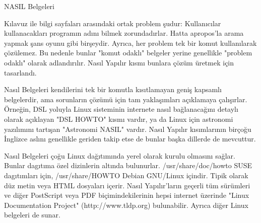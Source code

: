 \begin{section}{NASIL Belgeleri}

Kılavuz ile bilgi sayfaları arasındaki ortak problem şudur: Kullanıcılar kullanacakları programın adını bilmek zorundadırlar. Hatta apropos'la arama yapmak şans oyunu gibi birşeydir. Ayrıca, her problem tek bir komut kullanılarak çözülemez. Bu nedenle bunlar "komut odaklı" belgeler yerine genellikle "problem odaklı" olarak adlandırılır. Nasıl Yapılır kısmı bunlara çözüm üretmek için tasarlandı.

Nasıl Belgeleri kendilerini tek bir komutla  kısıtlamayan geniş kapsamlı belgelerdir, ama sorunların çözümü için tam yaklaşımları açıklamaya çalışırlar. Örneğin, DSL yoluyla Linux sisteminin internete nasıl bağlanacağını detaylı olarak açıklayan "DSL HOWTO" kısmı vardır, ya da Linux için astronomi yazılımını tartışan "Astronomi NASIL" vardır. Nasıl Yapılır kısımlarının birçoğu İnglizce aslını genellikle geriden takip etse de bunlar başka dillerde de mevcuttur.

Nasıl Belgeleri çoğu Linux dağıtımında yerel olarak kurulu olmasını sağlar. Bunlar dagıtıma özel dizinlerin altında bulunurlar. /usr/share/doc/howto SUSE dagıtımları için, /usr/share/HOWTO Debian GNU/Linux içindir. Tipik olarak düz metin veya HTML dosyaları içerir. Nasıl Yapılır'ların geçerli tüm sürümleri ve diğer PostScript veya PDF biçimindekilerinin hepsi internet üzerinde "Linux Documentation Project" (http://www.tldp.org) bulunabilir. Ayrıca diğer
Linux belgeleri de sunar.
\end{section}
